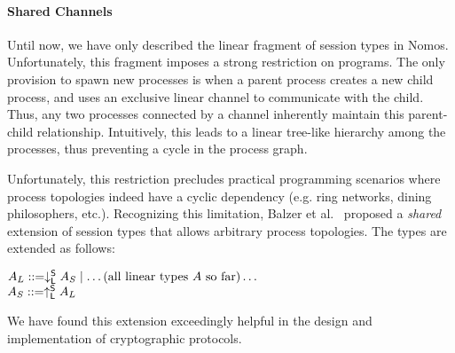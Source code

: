 
\paragraph*{\textbf{Shared Channels}}
Until now, we have only described the linear fragment of session types
in Nomos.
Unfortunately, this fragment imposes a strong restriction on programs.
The only provision to spawn new processes is when a parent process creates a new
child process, and uses an exclusive linear channel to communicate with the child.
Thus, any two processes connected by a channel inherently maintain this parent-child
relationship.
Intuitively, this leads to a linear tree-like hierarchy among the processes,
thus preventing a cycle in the process graph.

Unfortunately, this restriction precludes practical programming scenarios
where process topologies indeed have a cyclic dependency (e.g. ring networks,
dining philosophers, etc.).
Recognizing this limitation, Balzer et al.~\cite{Balzer17icfp} proposed
a \emph{shared} extension of session types that allows arbitrary process topologies.
The types are extended as follows:
\begin{center}
\begin{minipage}{0cm}
\begin{tabbing}
$A_L ::= \downarrow^{\mathsf{S}}_{\mathsf{L}} A_S \mid \ldots \text{(all linear types $A$ so far)}\ldots$\\
$A_S ::= \uparrow^{\mathsf{S}}_{\mathsf{L}} A_L$
\end{tabbing}
\end{minipage}
\end{center}
We have found this extension exceedingly helpful in the design and implementation
of cryptographic protocols.

